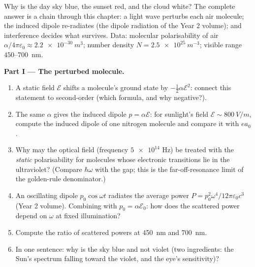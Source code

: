 \begin{problem}\label{pb:b3:perturbation-theory:1}
Why is the day sky blue, the sunset red, and the cloud white? The
complete answer is a chain through this chapter: a light wave
perturbs each air molecule; the induced dipole re-radiates (the
dipole radiation of the Year 2 volume); and interference decides
what survives. Data: molecular polarisability of air
$\alpha/4\pi\varepsilon_0 \approx \qty{2.2e-30}{m^3}$; number
density $N = \qty{2.5e25}{m^{-3}}$; visible range
$450$--\qty{700}{nm}.

\medskip\noindent\textbf{Part I --- The perturbed molecule.}
\begin{enumerate}
  \item A static field $\mathcal E$ shifts a molecule's ground
        state by $-\tfrac12\alpha\mathcal E^2$: connect this
        statement to second-order  (which
        formula, and why negative?).
  \item The same $\alpha$ gives the induced dipole $p =
        \alpha\mathcal E$: for sunlight's field $\mathcal E \sim
        \qty{800}{V/m}$, compute the induced dipole of one
        nitrogen molecule and compare it with $ea_0$.
  \item Why may the optical field (frequency $\num{5e14}$ Hz) be
        treated with the \emph{static} polarisability for
        molecules whose electronic transitions lie in the
        ultraviolet? (Compare $\hbar\omega$ with the gap; this is
        the far-off-resonance limit of the golden-rule
        denominator.)
  \item An oscillating dipole $p_0\cos\omega t$ radiates the
        average power $P = p_0^2\omega^4/12\pi\varepsilon_0c^3$
        (Year 2 volume). Combining with $p_0 = \alpha\mathcal
        E_0$: how does the scattered power depend on $\omega$ at
        fixed illumination?
  \item Compute the ratio of scattered powers at \qty{450}{nm}
        and \qty{700}{nm}.
  \item In one sentence: why is the sky blue and not violet
        (two ingredients: the Sun's spectrum falling toward the
        violet, and the eye's sensitivity)?
\end{enumerate}


\end{problem}

